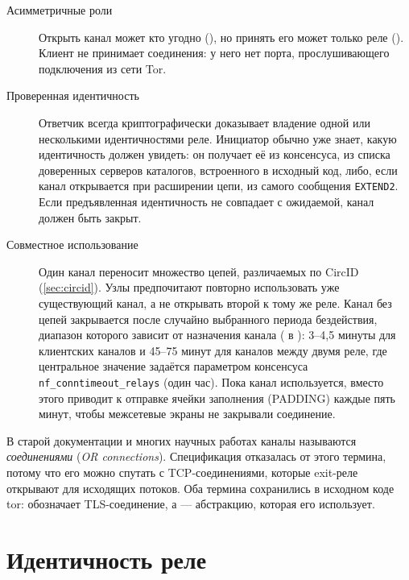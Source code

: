 \begin{description}
  \item[Асимметричные роли] Открыть канал может кто угодно (), но принять его может только реле (). Клиент не принимает соединения: у него нет порта, прослушивающего подключения из сети Tor.
  \item[Проверенная идентичность] Ответчик всегда криптографически доказывает владение одной или несколькими идентичностями реле. Инициатор обычно уже знает, какую идентичность должен увидеть: он получает её из консенсуса, из списка доверенных серверов каталогов, встроенного в исходный код, либо, если канал открывается при расширении цепи, из самого сообщения \texttt{EXTEND2}. Если предъявленная идентичность не совпадает с ожидаемой, канал должен быть закрыт.
  \item[Совместное использование] Один канал переносит множество цепей, различаемых по CircID (\cref{sec:circid}). Узлы предпочитают повторно использовать уже существующий канал, а не открывать второй к тому же реле. Канал без цепей закрывается после случайно выбранного периода бездействия, диапазон которого зависит от назначения канала ( в ): 3--4,5 минуты для клиентских каналов и 45--75 минут для каналов между двумя реле, где центральное значение задаётся параметром консенсуса \texttt{nf\_conntimeout\_relays} (один час). Пока канал используется,  вместо этого приводит к отправке ячейки заполнения (PADDING) каждые пять минут, чтобы межсетевые экраны не закрывали соединение.
\end{description}

\begin{approfondimento}
В старой документации и многих научных работах каналы называются \emph{соединениями} (\emph{OR connections}). Спецификация отказалась от этого термина, потому что его можно спутать с TCP-соединениями, которые exit-реле открывают для исходящих потоков. Оба термина сохранились в исходном коде tor:  обозначает TLS-соединение, а  --- абстракцию, которая его использует.
\end{approfondimento}

\section{Идентичность реле}\label{sec:canale-chiavi}

